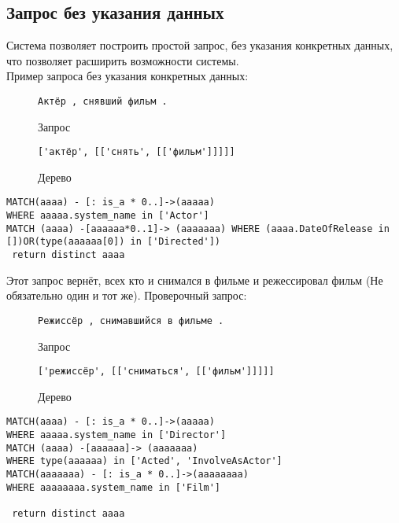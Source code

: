 \subsection{Запрос без указания данных}
Система позволяет построить простой запрос, без указания конкретных данных, что позволяет расширить возможности системы.\\
Пример запроса без указания конкретных данных:
\begin{figure}[!h]
\begin{tcolorbox}[colback=white, sharpish corners]
\begin{verbatim}
Актёр , снявший фильм .
\end{verbatim}
\end{tcolorbox}
\caption{Запрос}
\end{figure}
\begin{figure}[!h]
\begin{tcolorbox}[colback=white, sharpish corners]
\begin{verbatim}
['актёр', [['снять', [['фильм']]]]]
\end{verbatim}
\end{tcolorbox}
\caption{Дерево}
\end{figure}
\newpage
\begin{lstlisting}[caption={Результат}]
MATCH(aaaa) - [: is_a * 0..]->(aaaaa)
WHERE aaaaa.system_name in ['Actor']
MATCH (aaaa) -[aaaaaa*0..1]-> (aaaaaaa) WHERE (aaaa.DateOfRelease in [])OR(type(aaaaaa[0]) in ['Directed'])
 return distinct aaaa
\end{lstlisting}
Этот запрос вернёт, всех кто и снимался в фильме и режессировал фильм (Не обязательно один и тот же). 
Проверочный запрос:\\
\begin{figure}[!h]
\begin{tcolorbox}[colback=white, sharpish corners]
\begin{verbatim}
Режиссёр , снимавшийся в фильме .
\end{verbatim}
\end{tcolorbox}
\caption{Запрос}
\end{figure}
\begin{figure}[!h]
\begin{tcolorbox}[colback=white, sharpish corners]
\begin{verbatim}
['режиссёр', [['сниматься', [['фильм']]]]]
\end{verbatim}
\end{tcolorbox}
\caption{Дерево}
\end{figure}
\begin{lstlisting}[caption={Результат}]
MATCH(aaaa) - [: is_a * 0..]->(aaaaa)
WHERE aaaaa.system_name in ['Director']
MATCH (aaaa) -[aaaaaa]-> (aaaaaaa) 
WHERE type(aaaaaa) in ['Acted', 'InvolveAsActor']
MATCH(aaaaaaa) - [: is_a * 0..]->(aaaaaaaa)
WHERE aaaaaaaa.system_name in ['Film']

 return distinct aaaa
\end{lstlisting}

